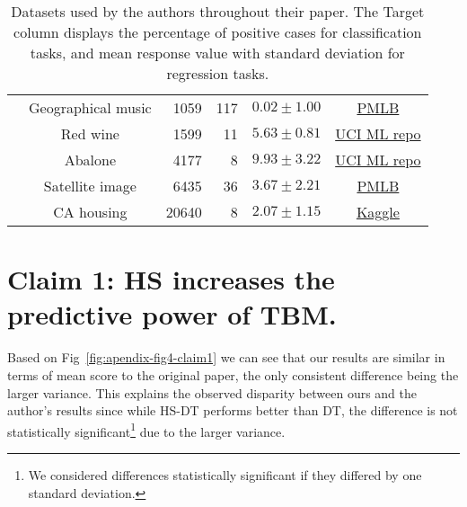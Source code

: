 \begin{table}[hbt]
\begin{tabular}{p{}|c|r|r|r|c}
        & Geographical music & 1059 & 117 & $ 0.02 \pm 1.00 $ & \href{https://epistasislab.github.io/pmlb/profile/4544_GeographicalOriginalofMusic.html}{PMLB} \\
        & Red wine & 1599 & 11 & $ 5.63 \pm 0.81 $ & \href{https://archive.ics.uci.edu/ml/datasets/Wine+Quality}{UCI ML repo} \\
        & Abalone & 4177 & 8 & $ 9.93 \pm 3.22 $ & \href{https://archive.ics.uci.edu/ml/datasets/Abalone}{UCI ML repo} \\
        & Satellite image & 6435 & 36 & $ 3.67 \pm 2.21 $ & \href{https://epistasislab.github.io/pmlb/profile/294_satellite_image.html}{PMLB} \\
        & CA housing & 20640 & 8 & $ 2.07 \pm 1.15 $ & \href{https://www.kaggle.com/datasets/camnugent/california-housing-prices}{Kaggle} \\
        \hline
    \end{tabular}
    \caption{Datasets used by the authors throughout their paper. The Target column displays the percentage of positive cases for classification tasks, and mean response value with standard deviation for regression tasks.}
    \label{tab:datasets}
\end{table}

\section{Claim 1: HS increases the predictive power of TBM.}
\label{appendix:claim1}

Based on Fig~\ref{fig:apendix-fig4-claim1} we can see that our results are similar in terms of mean score to the original paper, the only consistent difference being the larger variance. 
This explains the observed disparity between ours and the author's results since while HS-DT performs better than DT, the difference is not statistically significant\footnote{We considered differences statistically significant if they differed by one standard deviation.} due to the larger variance.

